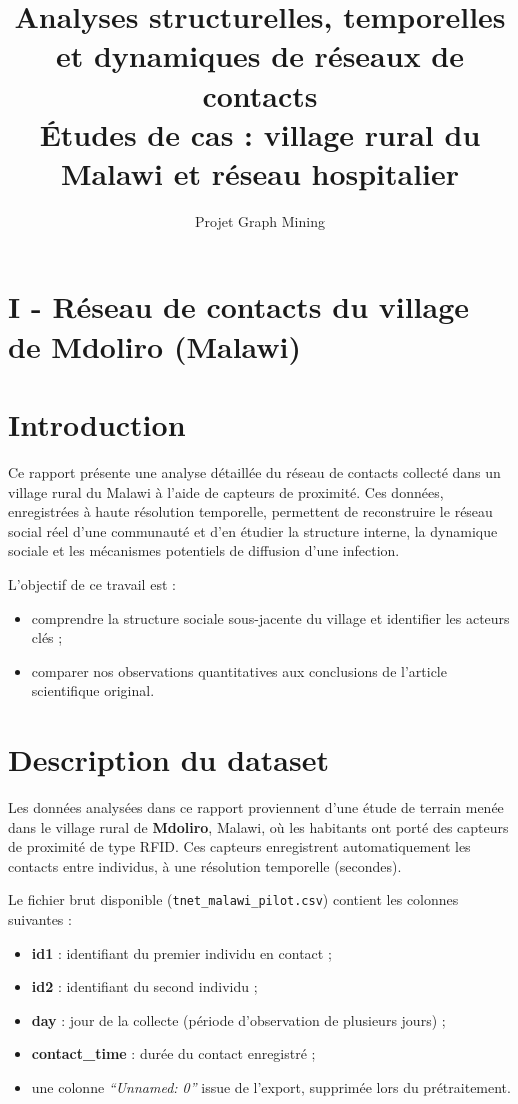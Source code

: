 \documentclass[10pt,twocolumn]{article}
\title{\textbf{Analyses structurelles, temporelles et dynamiques de réseaux de contacts}\\
\large Études de cas : village rural du Malawi et réseau hospitalier}
\author{Projet Graph Mining}
\date{}
\begin{document}
\maketitle
\newpage

\section*{I - Réseau de contacts du village de Mdoliro (Malawi)}


\section{Introduction}

Ce rapport présente une analyse détaillée du réseau de contacts 
collecté dans un village rural du Malawi à l’aide de capteurs de proximité. 
Ces données, enregistrées à haute résolution temporelle, permettent de reconstruire 
le réseau social réel d’une communauté et d’en étudier la structure interne, 
la dynamique sociale et les mécanismes potentiels de diffusion d’une infection.

L’objectif de ce travail est :
\begin{itemize}
    \item comprendre la structure sociale sous-jacente du village et identifier les acteurs clés ;
    \item comparer nos observations quantitatives aux conclusions de l’article scientifique original.
\end{itemize}


\section{Description du dataset}

Les données analysées dans ce rapport proviennent d’une étude de terrain menée dans le village rural de \textbf{Mdoliro},
 Malawi, où les habitants ont porté des capteurs de proximité de type RFID. 
Ces capteurs enregistrent automatiquement les contacts entre individus, 
à une résolution temporelle (secondes).

Le fichier brut disponible (\texttt{tnet\_malawi\_pilot.csv}) contient les colonnes suivantes :

\begin{itemize}
    \item \textbf{id1} : identifiant du premier individu en contact ;
    \item \textbf{id2} : identifiant du second individu ;
    \item \textbf{day} : jour de la collecte (période d’observation de plusieurs jours) ;
    \item \textbf{contact\_time} : durée du contact enregistré ;
    \item une colonne \textit{``Unnamed: 0''} issue de l’export, supprimée lors du prétraitement.
\end{itemize}
\end{document}
